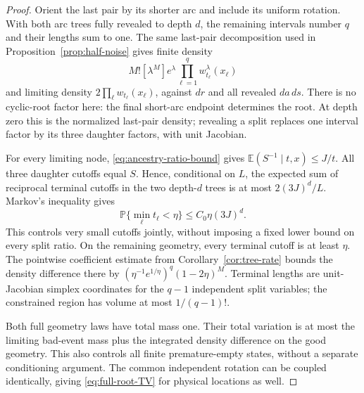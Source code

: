 \documentclass[11pt,letterpaper]{article}
\newcommand{\PP}{\mathbb P}\newcommand{\EE}{\mathbb E}
\begin{document}
\begin{proof}
Orient the last pair by its shorter arc and include its uniform
rotation. With both arc trees fully revealed to depth $d$, the
remaining intervals number $q$ and their lengths sum to one.
The same last-pair decomposition used in
Proposition~\ref{prop:half-noise} gives finite density
\[
 M![\lambda^M]e^\lambda
                  \prod_{\ell=1}^{q}w_{t_\ell}^\lambda(x_\ell)
\]
and limiting density $2\prod_\ell w_{t_\ell}(x_\ell)$, against
$dr$ and all revealed $da\,ds$. There is no cyclic-root factor
here: the final short-arc endpoint determines the root. At depth zero
this is the normalized last-pair density; revealing a split replaces
one interval factor by its three daughter factors, with unit Jacobian.

For every limiting node, \eqref{eq:ancestry-ratio-bound} gives
$\EE(S^{-1}\mid t,x)\le J/t$. All three daughter cutoffs equal
$S$. Hence, conditional on $L$, the expected sum of reciprocal
terminal cutoffs in the two depth-$d$ trees is at most
$2(3J)^d/L$. Markov's inequality gives
\[
 \PP\{\min_\ell t_\ell<\eta\}\le C_0\eta(3J)^d.
\]
This controls very small cutoffs jointly, without imposing a fixed
lower bound on every split ratio. On the remaining geometry,
every terminal cutoff is at least $\eta$.
The pointwise coefficient estimate from
Corollary~\ref{cor:tree-rate} bounds the density difference there by
$(\eta^{-1}e^{1/\eta})^q(1-2\eta)^M$.
Terminal lengths are unit-Jacobian simplex coordinates for the
$q-1$ independent split variables; the constrained region has volume
at most $1/(q-1)!$.

Both full geometry laws have total mass one. Their total variation is
at most the limiting bad-event mass plus the integrated density
difference on the good geometry. This also controls all finite
premature-empty states, without a separate conditioning argument.
The common independent rotation can be coupled identically, giving
\eqref{eq:full-root-TV} for physical locations as well.
\end{proof}
\end{document}
